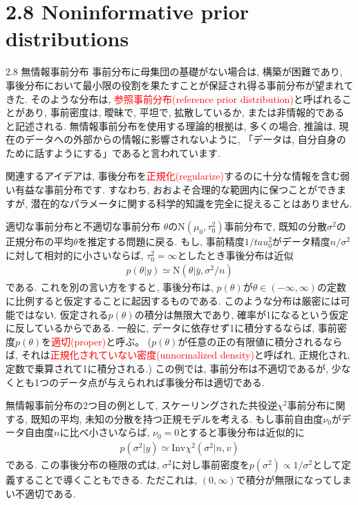 \documentclass[10pt,dvipdfmx,a4]{beamer}
\newcommand{\eqn}[1]{\begin{align*}#1\end{align*}}
\newcommand{\tcr}[1]{\textcolor{red}{#1}}
\begin{document}
\section{2.8 Noninformative prior distributions}
\begin{frame}{2.8 無情報事前分布}
事前分布に母集団の基礎がない場合は, 構築が困難であり, 事後分布において最小限の役割を果たすことが保証され得る事前分布が望まれてきた.
そのような分布は, \tcr{参照事前分布(reference prior distribution)}と呼ばれることがあり, 事前密度は, 曖昧で, 平坦で, 拡散しているか, または非情報的であると記述される.
無情報事前分布を使用する理論的根拠は, 多くの場合, 推論は, 現在のデータへの外部からの情報に影響されないように, 「データは, 自分自身のために話すようにする」であると言われています.

関連するアイデアは, 事後分布を\tcr{正規化(regularize)}するのに十分な情報を含む弱い有益な事前分布です.
すなわち, おおよそ合理的な範囲内に保つことができますが, 潜在的なパラメータに関する科学的知識を完全に捉えることはありません.
\end{frame}


\begin{frame}{適切な事前分布と不適切な事前分布}
$\theta$の$\text{N}(\mu_0,\tau_0^2)$事前分布で, 既知の分散$\sigma^2$の正規分布の平均$\theta$を推定する問題に戻る.
もし, 事前精度$1/tau_0^2$がデータ精度$n/\sigma^2$に対して相対的に小さいならば, $\tau_0^2=\infty$としたとき事後分布は近似
\eqn{p(\theta|y)\simeq\text{N}(\theta|\bar{y},\sigma^2/n)}
である.
これを別の言い方をすると, 事後分布は, $p(\theta)$が$\theta\in(-\infty, \infty)$の定数に比例すると仮定することに起因するものである.
このような分布は厳密には可能ではない.
仮定される$p(\theta)$の積分は無限大であり, 確率が1になるという仮定に反しているからである.
一般に, データに依存せず1に積分するならば, 事前密度$p(\theta)$を\tcr{適切(proper)}と呼ぶ。
($p(\theta)$が任意の正の有限値に積分されるならば, それは\tcr{正規化されていない密度(unnormalized density)}と呼ばれ, 正規化され, 定数で乗算されて1に積分される.)
この例では, 事前分布は不適切であるが, 少なくとも1つのデータ点が与えられれば事後分布は適切である.
\end{frame}


\begin{frame}
無情報事前分布の2つ目の例として, スケーリングされた共役逆$\chi^2$事前分布に関する, 既知の平均, 未知の分散を持つ正規モデルを考える. 
もし事前自由度$\nu_0$がデータ自由度$n$に比べ小さいならば, $\nu_0=0$とすると事後分布は近似的に
\eqn{p(\sigma^2|y)\simeq \text{Inv} \chi^2(\sigma^2|n,v)}
である.
この事後分布の極限の式は, $\sigma^2$に対し事前密度を$p(\sigma^2)\propto 1/\sigma^2$として定義することで導くこともできる.
ただこれは, $(0,\infty)$で積分が無限になってしまい不適切である.
\end{frame}
\end{document}
